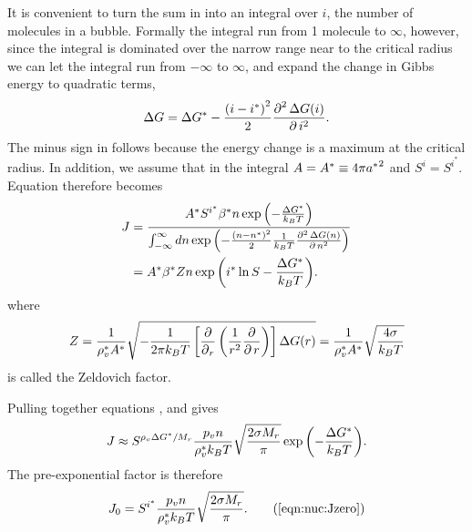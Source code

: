 It is convenient to turn the sum in  into an integral over $i$, the number of molecules in a bubble.
Formally the  integral run from 1 molecule to $\infty$,
however, since the integral is dominated over the narrow range  near to the critical radius we 
can let the integral run from $-\infty$ to $\infty$, and expand the change in Gibbs energy to quadratic terms,
\begin{align}
  \Delta G = \Delta G^\ast - \frac{\left( i-i^\ast \right)^2}{2}\frac{\operatorname{\partial}^2 \Delta G(i)}{\operatorname{\partial} i ^2}. \label{eqn:DeltaGExp}
\end{align}
The minus sign in  follows because the energy change is a maximum at the critical radius.
In addition, we assume that in the integral  $A = A^\ast \equiv 4\pi {a^\ast}^2$ and $S^i = S^{i^\ast}$. 
Equation  therefore becomes
\begin{align}
  J &= \frac{ A^\ast S^{i^\ast} \beta^\ast n\exp{ \left( - \frac{\Delta G^\ast}{k_BT} \right)   }}{\int_{-\infty}^\infty dn \exp{\left( - \frac{\left( n-n^\ast \right)^2}{2}\frac{1}{k_BT}\frac{\operatorname{\partial}^2 \Delta G(n)}{\operatorname{\partial}n ^2  } \right)}}
\\ &= { A^\ast \beta^\ast   Z  n\exp{ \left(  i^\ast\ln S -\frac{\Delta G^\ast}{k_BT} \right)   }}.
 \label{eqn:rateTwo}
\end{align}
where
\begin{align}
Z = \frac{1}{\rho_v^\ast A^\ast}\sqrt{-\frac{1}{2\pi \kB T}\lrsquare{\frac{\d}{\dr}\lr{\frac{1}{r^2}\frac{\d }{\d r}}}\Delta G(r)} 
= \frac{1}{\rho_v^\ast A^\ast}\sqrt{\frac{4\sigma}{\kB T}} %
\label{eqn:Zeldovich}
\end{align}
is called the Zeldovich factor.

Pulling together equations ,  and   gives
\begin{align}
  J \approx S^{{\rho_v\Delta G^\ast / M_r}}   
  \frac{p_v n}{  \rho_v^\ast k_B T}\sqrt{\frac{2\sigma M_r}{\pi }}
  \exp{ \left( - \frac{\Delta G^\ast}{k_BT} \right)   }.
\end{align}
The pre-exponential factor is therefore
\begin{align} 
J_0=  S^{i^*}   
  \frac{p_v n}{  \rho_v^\ast\kB T}\sqrt{\frac{2\sigma M_r}{\pi }}.
  \tag{\ref{eqn:nuc:Jzero}}
\end{align}

